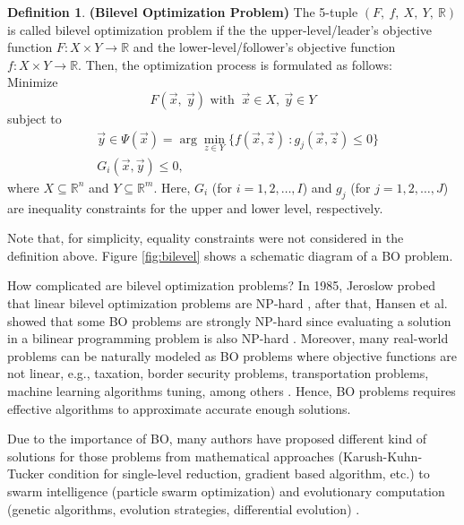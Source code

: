 \documentclass[conference]{IEEEtran}
\theoremstyle{definition}
\newtheorem{definition}{Definition}[section]
\begin{document}
\begin{definition}\textbf{(Bilevel Optimization Problem)}
    The 5-tuple $(F, \ f, \ X, \ Y, \ \mathbb{R} )$ is called bilevel optimization
    problem if the the upper-level/leader's objective function
    $F: X \times Y \to \mathbb{R}$ and the lower-level/follower's objective
    function $f: X \times Y \to \mathbb{R}$. Then, the optimization process is
    formulated as follows:\\
    \noindent
    Minimize
    \begin{equation}
        F(\vec{x},\ \vec{y}) \text{ with } \ \vec{x} \in X , \ \vec{y} \in Y 
        \label{eqn:minF1}
    \end{equation}
    subject to
    \begin{align}
        \label{eqn:y-arg}
        &\vec{y} \in \Psi(\vec{x}) = \arg \min_{z\in Y} \{ f(\vec{x}, \vec{z}) \ : g_j(\vec{x}, \vec{z})  \leq 0 \} \\
        &  G_{i}(\vec{x}, \vec{y}) \leq 0,
    \end{align}
    where $X \subseteq \mathbb{R}^n $
    and $Y \subseteq \mathbb{R}^m$.
    Here, $G_i$ (for $i = 1,2,\ldots,I$) and $g_j$ (for $j = 1,2,\ldots,J$) are
    inequality constraints for the upper and lower level, respectively.
\end{definition}
% 
Note that, for simplicity, equality constraints were not considered in the definition
above. Figure \ref{fig:bilevel} shows a schematic diagram of a BO problem.
% 

How complicated are bilevel optimization problems?  In 1985, Jeroslow probed that
linear bilevel optimization problems are NP-hard \cite{jeroslow1985polynomial},
after that, Hansen et al. showed that some BO problems are strongly NP-hard since
evaluating a solution in a bilinear programming problem is also NP-hard
\cite{hansen1992new,vicente1994descent}. Moreover, many real-world problems can
be naturally modeled as BO problems \cite{sinha2018review} where objective functions
are not linear, e.g., taxation, border security problems, transportation problems,
machine learning algorithms tuning, among others \cite{bard2013practical,sinha2018review,arroyo2010bilevel}.
Hence, BO problems requires effective algorithms to approximate accurate enough
solutions.

Due to the importance of BO, many authors have proposed different kind of solutions
for those problems from mathematical approaches (Karush-Kuhn-Tucker condition for
single-level reduction, gradient based algorithm, etc.) \cite{dempe2002foundations,shi2005extended}
to swarm intelligence (particle swarm optimization) and evolutionary computation
(genetic algorithms, evolution strategies, differential evolution)
\cite{derrac2011practical,angelo2013differential,li2006hierarchical}.
\end{document}
